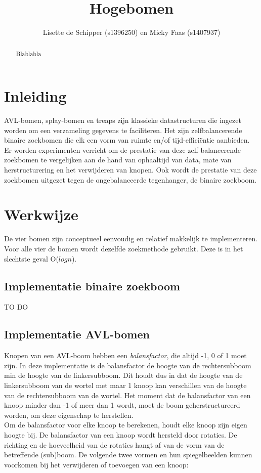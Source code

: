 \documentclass[a4paper,10pt]{article}
\title{ Hogebomen }
\author{ Lisette de Schipper (s1396250) en Micky Faas (s1407937) }
\date{}
\begin{document}
\maketitle

\begin{abstract}
Blablabla
\end{abstract}

\section{Inleiding}
AVL-bomen, splay-bomen en treaps zijn klassieke datastructuren die ingezet worden om een verzameling gegevens te faciliteren. Het zijn zelfbalancerende binaire zoekbomen die elk een vorm van ruimte en/of tijd-effici\"entie aanbieden. Er worden experimenten verricht om de prestatie van deze zelf-balancerende zoekbomen te vergelijken aan de hand van ophaaltijd van data, mate van herstructurering en het verwijderen van knopen. Ook wordt de prestatie van deze zoekbomen uitgezet tegen de ongebalanceerde tegenhanger, de binaire zoekboom.

\section{Werkwijze}
De vier bomen zijn conceptueel eenvoudig en relatief makkelijk te implementeren. Voor alle vier de bomen wordt dezelfde zoekmethode gebruikt. Deze is in het slechtste geval O($logn$).
\subsection{Implementatie binaire zoekboom}
TO DO
\subsection{Implementatie AVL-bomen}
Knopen van een AVL-boom hebben een \emph{balansfactor}, die altijd -1, 0 of 1 moet zijn. In deze implementatie is de balansfactor de hoogte van de rechtersubboom min de hoogte van de linkersubboom. Dit houdt dus in dat de hoogte van de linkersubboom van de wortel met maar 1 knoop kan verschillen van de hoogte van de rechtersubboom van de wortel. Het moment dat de balansfactor van een knoop minder dan -1 of meer dan 1 wordt, moet de boom geherstructureerd worden, om deze eigenschap te herstellen. \\

Om de balansfactor voor elke knoop te berekenen, houdt elke knoop zijn eigen hoogte bij. De balansfactor van een knoop wordt hersteld door rotaties. De richting en de hoeveelheid van de rotaties hangt af van de vorm van de betreffende (sub)boom. De volgende twee vormen en hun spiegelbeelden kunnen voorkomen bij het verwijderen of toevoegen van een knoop: \\
\end{document}
